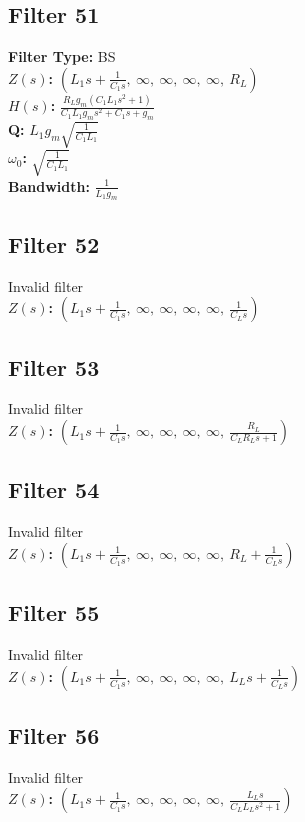 \documentclass{article}
\begin{document}
\subsection*{Filter 51}
\textbf{Filter Type:} BS \\ 
\textbf{$Z(s)$:} $\left( L_{1} s + \frac{1}{C_{1} s}, \  \infty, \  \infty, \  \infty, \  \infty, \  R_{L}\right)$ \\ 
\textbf{$H(s)$:} $\frac{R_{L} g_{m} \left(C_{1} L_{1} s^{2} + 1\right)}{C_{1} L_{1} g_{m} s^{2} + C_{1} s + g_{m}}$ \\ 
\textbf{Q:} $L_{1} g_{m} \sqrt{\frac{1}{C_{1} L_{1}}}$ \\ 
\textbf{$\omega_0$:} $\sqrt{\frac{1}{C_{1} L_{1}}}$ \\ 
\textbf{Bandwidth:} $\frac{1}{L_{1} g_{m}}$ \\ 
\subsection*{Filter 52}
Invalid filter \\ 
\textbf{$Z(s)$:} $\left( L_{1} s + \frac{1}{C_{1} s}, \  \infty, \  \infty, \  \infty, \  \infty, \  \frac{1}{C_{L} s}\right)$ \\ 
\subsection*{Filter 53}
Invalid filter \\ 
\textbf{$Z(s)$:} $\left( L_{1} s + \frac{1}{C_{1} s}, \  \infty, \  \infty, \  \infty, \  \infty, \  \frac{R_{L}}{C_{L} R_{L} s + 1}\right)$ \\ 
\subsection*{Filter 54}
Invalid filter \\ 
\textbf{$Z(s)$:} $\left( L_{1} s + \frac{1}{C_{1} s}, \  \infty, \  \infty, \  \infty, \  \infty, \  R_{L} + \frac{1}{C_{L} s}\right)$ \\ 
\subsection*{Filter 55}
Invalid filter \\ 
\textbf{$Z(s)$:} $\left( L_{1} s + \frac{1}{C_{1} s}, \  \infty, \  \infty, \  \infty, \  \infty, \  L_{L} s + \frac{1}{C_{L} s}\right)$ \\ 
\subsection*{Filter 56}
Invalid filter \\ 
\textbf{$Z(s)$:} $\left( L_{1} s + \frac{1}{C_{1} s}, \  \infty, \  \infty, \  \infty, \  \infty, \  \frac{L_{L} s}{C_{L} L_{L} s^{2} + 1}\right)$ \\ 
\end{document}
